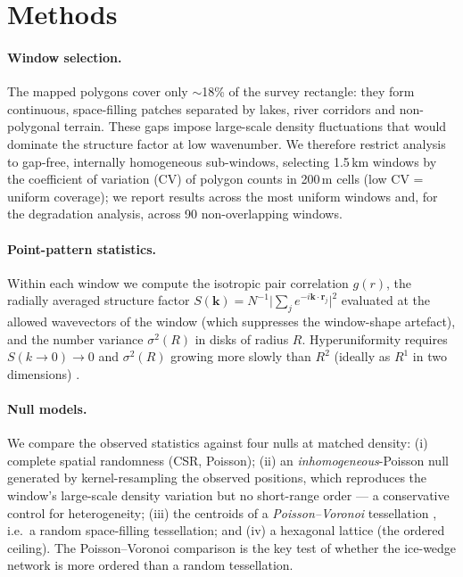 \documentclass[11pt]{article}
\begin{document}
\section{Methods}
\paragraph{Window selection.}
The mapped polygons cover only $\sim$18\% of the survey rectangle: they form continuous,
space-filling patches separated by lakes, river corridors and non-polygonal terrain. These
gaps impose large-scale density fluctuations that would dominate the structure factor at low
wavenumber. We therefore restrict analysis to gap-free, internally homogeneous sub-windows,
selecting 1.5\,km windows by the coefficient of variation (CV) of polygon counts in 200\,m
cells (low CV = uniform coverage); we report results across the most uniform windows and, for
the degradation analysis, across 90 non-overlapping windows.

\paragraph{Point-pattern statistics.}
Within each window we compute the isotropic pair correlation $g(r)$, the radially averaged
structure factor
$S(\mathbf k)=N^{-1}\big|\sum_j e^{-i\mathbf k\cdot\mathbf r_j}\big|^2$ evaluated at the
allowed wavevectors of the window (which suppresses the window-shape artefact), and the number
variance $\sigma^2(R)$ in disks of radius $R$. Hyperuniformity requires
$S(k\!\to\!0)\!\to\!0$ and $\sigma^2(R)$ growing more slowly than $R^2$ (ideally as $R^1$ in
two dimensions) \citep{torquato2003,torquato2018}.

\paragraph{Null models.}
We compare the observed statistics against four nulls at matched density: (i) complete
spatial randomness (CSR, Poisson); (ii) an \emph{inhomogeneous}-Poisson null generated by
kernel-resampling the observed positions, which reproduces the window's large-scale density
variation but no short-range order --- a conservative control for heterogeneity; (iii) the
centroids of a \emph{Poisson--Voronoi} tessellation \citep{okabe2000}, i.e.\ a random
space-filling tessellation; and (iv) a hexagonal lattice (the ordered ceiling). The
Poisson--Voronoi comparison is the key test of whether the ice-wedge network is more ordered
than a random tessellation.
\end{document}

